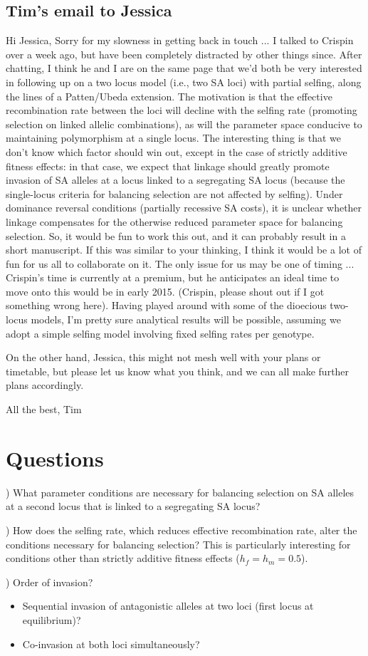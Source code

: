 \documentclass[11pt]{article}
\begin{document}
\subsection*{Tim's email to Jessica}
	Hi Jessica,
	Sorry for my slowness in getting back in touch ... I talked to Crispin over a week ago, but have been completely distracted by other things since. After chatting, I think he and I are on the same page that we'd both be very interested in following up on a two locus model (i.e., two SA loci) with partial selfing, along the lines of a Patten/Ubeda extension. The motivation is that the effective recombination rate between the loci will decline with the selfing rate (promoting selection on linked allelic combinations), as will the parameter space conducive to maintaining polymorphism at a single locus. The interesting thing is that we don't know which factor should win out, except in the case of strictly additive fitness effects: in that case, we expect that linkage should greatly promote invasion of SA alleles at a locus linked to a segregating SA locus (because the single-locus criteria for balancing selection are not affected by selfing). Under dominance reversal conditions (partially recessive SA costs), it is unclear whether linkage compensates for the otherwise reduced parameter space for balancing selection. So, it would be fun to work this out, and it can probably result in a short manuscript. If this was similar to your thinking, I think it would be a lot of fun for us all to collaborate on it. The only issue for us may be one of timing ... Crispin's time is currently at a premium, but he anticipates an ideal time to move onto this would be in early 2015. (Crispin, please shout out if I got something wrong here). Having played around with some of the dioecious two-locus models, I'm pretty sure analytical results will be possible, assuming we adopt a simple selfing model involving fixed selfing rates per genotype. 

	On the other hand, Jessica, this might not mesh well with your plans or timetable, but please let us know what you think, and we can all make further plans accordingly.

	All the best,
	Tim


\section*{Questions}
) What parameter conditions are necessary for balancing selection on SA alleles at a second locus that is linked to a segregating SA locus? \bigskip

) How does the selfing rate, which reduces effective recombination rate, alter the conditions necessary for balancing selection? This is particularly interesting for conditions other than strictly additive fitness effects ($h_f=h_m=0.5$). \bigskip

) Order of invasion? 
\begin{itemize}
  \item Sequential invasion of antagonistic alleles at two loci (first locus at equilibrium)?
  \item Co-invasion at both loci simultaneously?
\end{itemize}

\newpage{}
\end{document}
